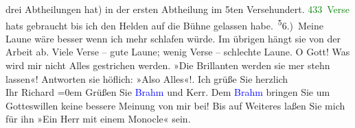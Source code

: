                drei Abtheilungen hat) in der ersten Abtheilung im 5ten Versehundert. \textcolor{green}{433 Verse}{} hats gebraucht bis ich den Helden
               auf die Bühne gelassen habe. \substVorne{}\textsuperscript{5}\substDazwischen{}6\substHinten{}.) Meine Laune wäre besser {\pb}wenn ich mehr schlafen würde. Im übrigen hängt sie von der Arbeit ab. Viele Verse –
               gute Laune; wenig Verse – schlechte Laune. O Gott! Was wird mir nicht Alles
               gestrichen werden. »Die Brillanten werden sie mer stehn lassen«! Antworten sie
               höflich: »Also Alles«!.\pend
           \pstart
            Ich grüße Sie herzlich{\\[\baselineskip]}Ihr \spacefill\mbox{Richard}\pend
           \leftskip=0em{}\pstart
           \noindent{}Grüßen Sie \textcolor{blue}{Brahm}{}\ledrightnote{\textcolor{blue}{Otto Brahm}} und Kerr. Dem \textcolor{blue}{Brahm}{}\ledrightnote{\textcolor{blue}{Otto Brahm}} bringen Sie um Gotteswillen keine bessere
                  Meinung von mir bei! Bis auf Weiteres laßen Sie mich für ihn »Ein Herr mit einem
                  Monocle« sein.\pend
           \endnumbering{}  
      